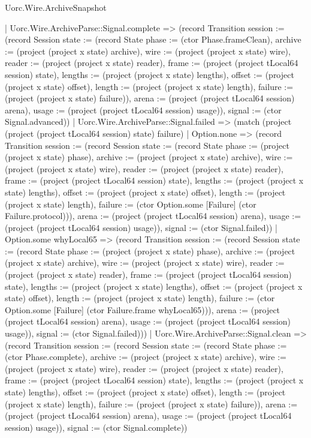 \begin{lexlean}{Uorc.Wire.ArchiveSnapshot}
\begin{semanticmodule}
{        | Uorc.Wire.ArchiveParse::Signal.complete => (record Transition {session := (record Session {state := (record State {phase := (ctor Phase.frameClean), archive := (project (project x state) archive), wire := (project (project x state) wire), reader := (project (project x state) reader), frame := (project (project tLocal64 session) state), lengths := (project (project x state) lengths), offset := (project (project x state) offset), length := (project (project x state) length), failure := (project (project x state) failure)}), arena := (project (project tLocal64 session) arena), usage := (project (project tLocal64 session) usage)}), signal := (ctor Signal.advanced)})
        | Uorc.Wire.ArchiveParse::Signal.failed => (match (project (project (project tLocal64 session) state) failure)
          | Option.none => (record Transition {session := (record Session {state := (record State {phase := (project (project x state) phase), archive := (project (project x state) archive), wire := (project (project x state) wire), reader := (project (project x state) reader), frame := (project (project tLocal64 session) state), lengths := (project (project x state) lengths), offset := (project (project x state) offset), length := (project (project x state) length), failure := (ctor Option.some [Failure] (ctor Failure.protocol))}), arena := (project (project tLocal64 session) arena), usage := (project (project tLocal64 session) usage)}), signal := (ctor Signal.failed)})
          | Option.some whyLocal65 => (record Transition {session := (record Session {state := (record State {phase := (project (project x state) phase), archive := (project (project x state) archive), wire := (project (project x state) wire), reader := (project (project x state) reader), frame := (project (project tLocal64 session) state), lengths := (project (project x state) lengths), offset := (project (project x state) offset), length := (project (project x state) length), failure := (ctor Option.some [Failure] (ctor Failure.frame whyLocal65))}), arena := (project (project tLocal64 session) arena), usage := (project (project tLocal64 session) usage)}), signal := (ctor Signal.failed)}))
        | Uorc.Wire.ArchiveParse::Signal.clean => (record Transition {session := (record Session {state := (record State {phase := (ctor Phase.complete), archive := (project (project x state) archive), wire := (project (project x state) wire), reader := (project (project x state) reader), frame := (project (project tLocal64 session) state), lengths := (project (project x state) lengths), offset := (project (project x state) offset), length := (project (project x state) length), failure := (project (project x state) failure)}), arena := (project (project tLocal64 session) arena), usage := (project (project tLocal64 session) usage)}), signal := (ctor Signal.complete)})
}
\end{semanticmodule}
\end{lexlean}
